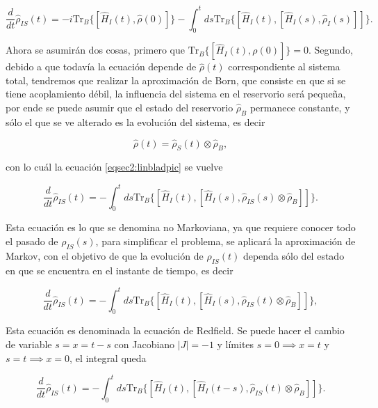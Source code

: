 \begin{equation}
    \frac{d}{dt}\hat{\rho}_{IS}(t) = -i \text{Tr}_{B}\{[\hat{H}_{I}(t),\hat{\rho}(0)] \}  -  \int_{0}^{t}ds \text{Tr}_{B}\{[\hat{H}_{I}(t), [\hat{H}_{I}(s),\hat{\rho}_{I}(s)]]\}.
\end{equation}

Ahora se asumirán dos cosas, primero que $\text{Tr}_{B}\{[\hat{H}_{I}(t),\rho(0)] \} = 0$. Segundo, debido a que todavía la ecuación depende de $\hat{\rho}(t)$ correspondiente al sistema total, tendremos que realizar la aproximación de Born, que consiste en que si se tiene acoplamiento débil, la influencia del sistema en el reservorio será pequeña, por ende se puede asumir que el estado del reservorio $\hat{\rho}_{B}$ permanece constante, y sólo el que se ve alterado es la evolución del sistema, es decir

\begin{equation*}
    \hat{\rho}(t) = \hat{\rho}_{S}(t)\otimes \hat{\rho}_{B},
\end{equation*}

con lo cuál la ecuación \ref{eqsec2:linbladpic} se vuelve

\begin{equation}
    \frac{d}{dt}\hat{\rho}_{IS}(t) = -  \int_{0}^{t}ds \text{Tr}_{B}\{[\hat{H}_{I}(t), [\hat{H}_{I}(s),\hat{\rho}_{IS}(s) \otimes \hat{\rho}_{B}]]\}.
\end{equation} 

Esta ecuación es lo que se denomina no Markoviana, ya que requiere conocer todo el pasado de $\rho_{IS}(s)$, para simplificar el problema, se aplicará la aproximación de Markov, con el objetivo de que la evolución de $\hat{\rho}_{IS}(t)$ dependa sólo del estado en que se encuentra en el instante de tiempo, es decir

\begin{equation*}
    \frac{d}{dt}\hat{\rho}_{IS}(t) = -  \int_{0}^{t}ds \text{Tr}_{B}\{[\hat{H}_{I}(t), [\hat{H}_{I}(s),\hat{\rho}_{IS}(t) \otimes \hat{\rho}_{B}]]\},
\end{equation*} 

Esta ecuación es denominada la ecuación de Redfield. Se puede hacer el cambio de variable $s= x = t-s$ con Jacobiano $|J| = -1$ y límites $s=0 \implies x = t$ y $s=t \implies x = 0$, el integral queda

\begin{equation}
    \frac{d}{dt}\hat{\rho}_{IS}(t) = -  \int_{0}^{t}ds \text{Tr}_{B}\{[\hat{H}_{I}(t), [\hat{H}_{I}(t-s),\hat{\rho}_{IS}(t) \otimes \hat{\rho}_{B}]]\}.
    \label{eq3sec2:markov}
\end{equation} 

